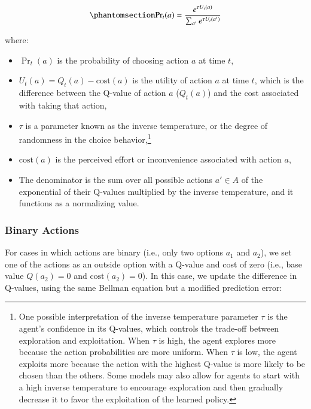 \documentclass[
  number,
  preprint,
  3p,
  onecolumn]{elsarticle}
\begin{document}
\begin{equation}\phantomsection\label{eq-softmax}{
\text{Pr}_t(a) = \frac{e^{\tau U_t(a)}}{\sum_{a'} e^{\tau U_t(a')}}
}\end{equation}

where:

\begin{itemize}
\item
  \(\Pr_t(a)\) is the probability of choosing action \(a\) at time
  \(t\),
\item
  \(U_t(a) = Q_t(a) - \text{cost}(a)\) is the utility of action \(a\) at
  time \(t\), which is the difference between the Q-value of action
  \(a\) (\(Q_t(a)\)) and the cost associated with taking that action,
\item
  \(\tau\) is a parameter known as the inverse temperature, or the
  degree of randomness in the choice behavior,\footnote{One possible
    interpretation of the inverse temperature parameter \(\tau\) is the
    agent's confidence in its Q-values, which controls the trade-off
    between exploration and exploitation. When \(\tau\) is high, the
    agent explores more because the action probabilities are more
    uniform. When \(\tau\) is low, the agent exploits more because the
    action with the highest Q-value is more likely to be chosen than the
    others. Some models may also allow for agents to start with a high
    inverse temperature to encourage exploration and then gradually
    decrease it to favor the exploitation of the learned policy.}
\item
  \(\text{cost}(a)\) is the perceived effort or inconvenience associated
  with action \(a\),
\item
  The denominator is the sum over all possible actions \(a' \in A\) of
  the exponential of their Q-values multiplied by the inverse
  temperature, and it functions as a normalizing value.
\end{itemize}

\subsubsection{Binary Actions}\label{binary-actions}

For cases in which actions are binary (i.e., only two options \(a_1\)
and \(a_2\)), we set one of the actions as an outside option with a
Q-value and cost of zero (i.e., base value \(Q(a_2)=0\) and
\(\text{cost}(a_2)=0\)). In this case, we update the difference in
Q-values, using the same Bellman equation but a modified prediction
error:
\end{document}
